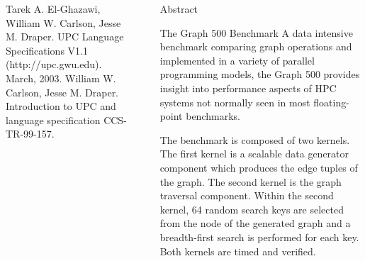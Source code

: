 \documentclass[final]{beamer}
\newlength{\sepwid}
\newlength{\onecolwid}
\newlength{\twocolwid}
\begin{document}
\begin{frame}[t]
\begin{columns}[t]
\begin{column}{\onecolwid}
{{\begin{thebibliography}{99}
					 Tarek A. El-Ghazawi, William W. Carlson, Jesse M. Draper. UPC Language Specifications V1.1 (http://upc.gwu.edu). March, 2003.
					  William W. Carlson, Jesse M. Draper. Introduction to UPC and language specification CCS-TR-99-157.
					 \end{thebibliography}}}
			\end{column}
			\begin{column}{\sepwid}\end{column}			%
			\begin{column}{\twocolwid}
				\begin{alertblock}{Abstract}
				\end{alertblock}
				\begin{block}{The Graph 500 Benchmark}
					A data intensive benchmark comparing graph operations and implemented in a variety of parallel programming models, the Graph 500 provides insight into performance aspects of HPC systems not normally seen in most floating-point benchmarks. 
					
					The benchmark is composed of two kernels. The first kernel is a scalable data generator component which produces the edge tuples of the graph.  The second kernel is the graph traversal component.  Within the second kernel, 64 random search keys are selected from the node of the generated  graph and a breadth-first search is performed for each key. Both kernels are timed and verified.
					

\end{block}
\end{column}
\end{columns}
\end{frame}
\end{document}
